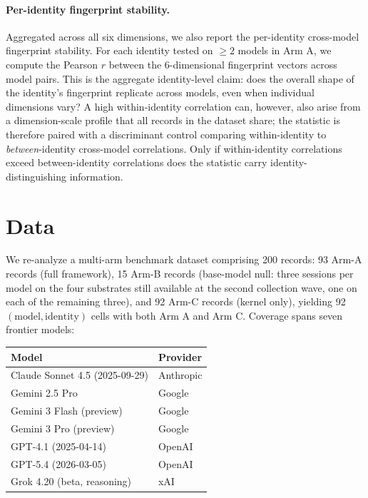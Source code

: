 \documentclass[11pt]{article}
\begin{document}
\paragraph{Per-identity fingerprint stability.}
Aggregated across all six dimensions, we also report the per-identity cross-model fingerprint stability. For each identity tested on $\geq 2$ models in Arm A, we compute the Pearson $r$ between the 6-dimensional fingerprint vectors across model pairs. This is the aggregate identity-level claim: does the overall shape of the identity's fingerprint replicate across models, even when individual dimensions vary? A high within-identity correlation can, however, also arise from a dimension-scale profile that all records in the dataset share; the statistic is therefore paired with a discriminant control comparing within-identity to \emph{between}-identity cross-model correlations. Only if within-identity correlations exceed between-identity correlations does the statistic carry identity-distinguishing information.

\section{Data}
\label{sec:data}

We re-analyze a multi-arm benchmark dataset comprising 200 records: 93 Arm-A records (full framework), 15 Arm-B records (base-model null: three sessions per model on the four substrates still available at the second collection wave, one on each of the remaining three), and 92 Arm-C records (kernel only), yielding 92 $(\text{model}, \text{identity})$ cells with both Arm A and Arm C. Coverage spans seven frontier models:

\begin{center}
\begin{tabular}{ll}
\toprule
Model & Provider \\
\midrule
Claude Sonnet 4.5 (2025-09-29) & Anthropic \\
Gemini 2.5 Pro                 & Google \\
Gemini 3 Flash (preview)       & Google \\
Gemini 3 Pro (preview)         & Google \\
GPT-4.1 (2025-04-14)           & OpenAI \\
GPT-5.4 (2026-03-05)           & OpenAI \\
Grok 4.20 (beta, reasoning)    & xAI \\
\bottomrule
\end{tabular}
\end{center}
\end{document}

